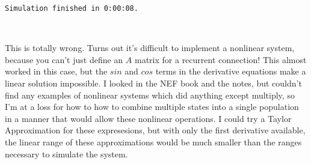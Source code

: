 \documentclass{article}
\begin{document}
    \begin{Verbatim}[commandchars=\\\{\}]
Simulation finished in 0:00:08.
    \end{Verbatim}

    \begin{center}
    \end{center}
    { \hspace*{\fill} \\}
    
This is totally wrong. Turns out it's difficult to implement a nonlinear system, because you can't just define an $A$ matrix for a recurrent connection! This almost worked in this case, but the $sin$ and $cos$ terms in the derivative equations make a linear solution impossible. I looked in the NEF book and the notes, but couldn't find any examples of nonlinear systems which did anything except multiply, so I'm at a loss for how to how to combine multiple states into a single population in a manner that would allow these nonlinear operations. I could try a Taylor Approximation for these expresesions, but with only the first derivative available, the linear range of these approximations would be much smaller than the ranges necessary to simulate the system.
\end{document}
